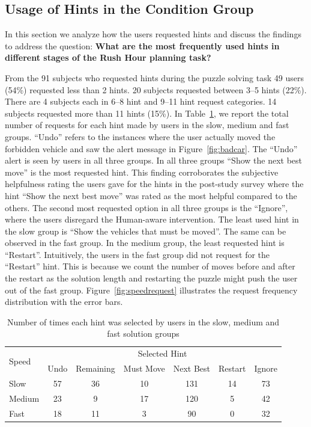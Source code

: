 \subsection{Usage of Hints in the Condition Group}
In this section we analyze how the users requested hints and discuss the findings to address the question: \textbf{What are the most frequently used hints in different stages of the Rush Hour planning task?}

From the 91 subjects who requested hints during the puzzle solving task 49 users (54\%) requested less than 2 hints. 20 subjects requested between 3--5 hints (22\%). 
There are 4 subjects each in 6--8 hint and 9--11 hint request categories. 
14 subjects requested more than 11 hints (15\%).
In Table~\ref{tab:speedsandrequests}, we report the total number of requests for each hint  made by users in the slow, medium and fast groups.
``Undo'' refers to the instances where the user actually moved the forbidden vehicle and saw the alert message in Figure~\ref{fig:badcar}.
The ``Undo'' alert is seen by users in all three groups.
In all three groups ``Show the next best move'' is the most requested hint. 
This finding corroborates the subjective helpfulness rating the users gave for the hints in the post-study survey where the hint ``Show the next best move'' was rated as the most helpful compared to the others.
The second most requested option in all three groups is the ``Ignore'', where the users disregard the Human-aware intervention.
The least used hint in the slow group is ``Show the vehicles that must be moved''.
The same can be observed in the fast group.
In the medium group, the least requested hint is ``Restart''.
Intuitively, the users in the fast group did not request for the ``Restart'' hint.
This is because we count the number of moves before and after the restart as the solution length and restarting the puzzle might push the user out of the fast group.
Figure~\ref{fig:speedrequest} illustrates the request frequency distribution with the error bars.


\begin{table}[tpb]
\caption{Number of times each hint was selected by users in the slow, medium and fast solution groups}
\begin{tabular}{|l|cccccc|}
\hline
\multirow{2}{*}{Speed} & \multicolumn{6}{c|}{Selected Hint} \\ \cline{2-7} 
 & \multicolumn{1}{c|}{Undo} & \multicolumn{1}{c|}{Remaining} & \multicolumn{1}{c|}{Must Move} & \multicolumn{1}{c|}{Next Best} & \multicolumn{1}{c|}{Restart} & Ignore \\ \hline
Slow & 57 & 36 & 10 & 131 & 14 & 73 \\ \hline
Medium & 23 & 9 & 17 & 120 & 5 & 42 \\ \hline
Fast & 18 & 11 & 3 & 90 & 0 & 32 \\ \hline
\end{tabular}

\label{tab:speedsandrequests}
\end{table}

